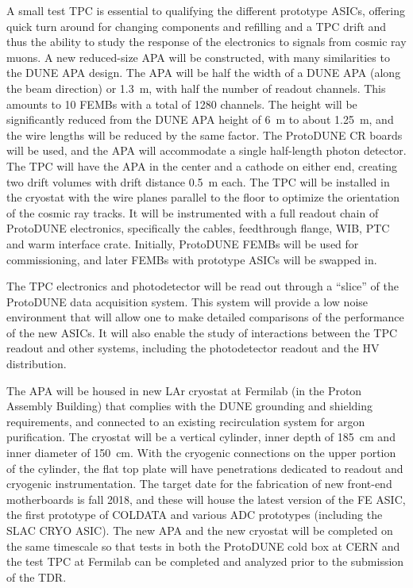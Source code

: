 A small test TPC is essential to qualifying the different prototype ASICs, offering quick turn around for changing components and refilling and a TPC drift and thus the ability to study the response of the electronics to signals from cosmic ray muons.  
A new reduced-size APA will be constructed, with many similarities to the DUNE APA design.  The APA will be half the width of a DUNE APA (along the beam direction) or 1.3~m, with half the number of readout channels.  This amounts to 10 FEMBs with a total of 1280 channels.
The height will be significantly reduced from the DUNE APA height of 6~m to about 1.25~m, and the wire lengths will be reduced by the same factor.  The ProtoDUNE CR boards will be used, and 
 the APA will accommodate a single half-length photon detector.  The TPC will have the APA in the center and a cathode on either end, creating two drift volumes with drift distance 0.5~m each.  The TPC will be installed in the cryostat with the wire planes parallel to the floor to optimize the orientation of the cosmic ray tracks.
 It will be instrumented with a full readout chain of ProtoDUNE electronics, specifically  the cables, feedthrough flange, WIB, PTC and warm interface crate.  Initially, ProtoDUNE FEMBs will be used for commissioning, and later FEMBs with prototype ASICs will be swapped in.

The TPC electronics and photodetector will be read out through a ``slice'' of the ProtoDUNE data acquisition system.  This system will provide a low noise environment that will allow one to make detailed comparisons of the performance of the new ASICs. It will also enable the study of interactions between the TPC readout and other systems, including the photodetector readout and the HV distribution.
 
The APA will be housed in new LAr cryostat at Fermilab (in the Proton Assembly Building) that complies with the DUNE grounding and shielding requirements, and connected to an existing recirculation system for argon purification.  The cryostat will be a vertical cylinder, inner depth of 185~cm and inner diameter of 150~cm.  With the cryogenic connections on the upper portion of the cylinder, the flat top plate will have penetrations dedicated to readout and cryogenic instrumentation.  The target date for the fabrication of new front-end motherboards is fall 2018, and these will house the latest version of the FE ASIC, the first prototype of COLDATA and various ADC prototypes (including the SLAC CRYO ASIC).   The new APA and the new cryostat will be completed on the same timescale so that tests in both the ProtoDUNE cold box at CERN and the test TPC at Fermilab can be completed and analyzed prior to the submission of the TDR.  
